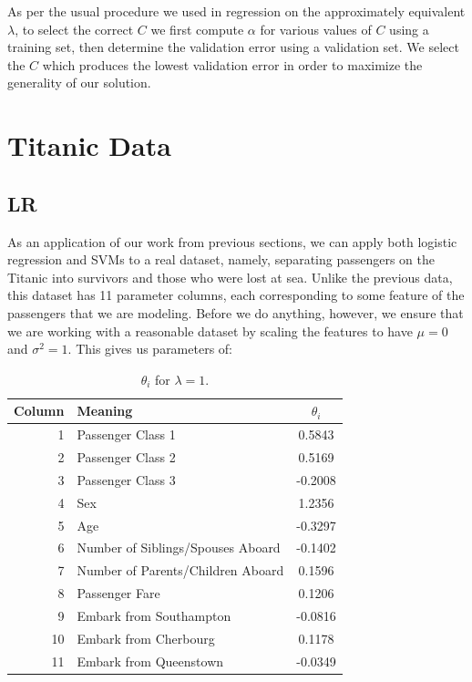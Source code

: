 \documentclass[10pt,letterpaper]{article}
\begin{document}
As per the usual procedure we used in regression on the approximately equivalent $\lambda$, to select the correct $C$ we first compute $\alpha$ for various values of $C$ using a training set, then determine the validation error using a validation set. We select the $C$ which produces the lowest validation error in order to maximize the generality of our solution.
\section{Titanic Data}

\subsection{LR}
As an application of our work from previous sections, we can apply both logistic regression and SVMs to a real dataset, namely, separating passengers on the Titanic into survivors and those who were lost at sea. Unlike the previous data, this dataset has 11 parameter columns, each corresponding to some feature of the passengers that we are modeling. Before we do anything, however, we ensure that we are working with a reasonable dataset by scaling the features to have $\mu = 0$ and $\sigma^2 = 1$. This gives us parameters of:
\begin{table}[!htb]
\centering
\caption{$\theta_i$ for $\lambda = 1$.}
\begin{tabular}{rlc}
Column & Meaning                           & $\theta_i$\\ \hline
1      & Passenger Class 1                 & 0.5843  \\
2      & Passenger Class 2                 & 0.5169  \\
3      & Passenger Class 3                 & -0.2008 \\
4      & Sex                               & 1.2356    \\
5      & Age                               & -0.3297 \\
6      & Number of Siblings/Spouses Aboard & -0.1402 \\
7      & Number of Parents/Children Aboard & 0.1596  \\
8      & Passenger Fare                    & 0.1206   \\
9      & Embark from Southampton           & -0.0816 \\
10     & Embark from Cherbourg             & 0.1178  \\
11     & Embark from Queenstown            & -0.0349  \\
\end{tabular}
\end{table}
\end{document}

